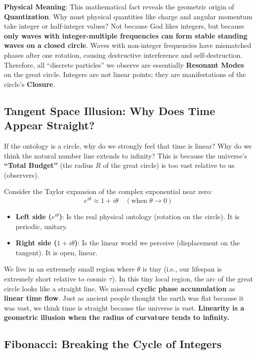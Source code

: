 \textbf{Physical Meaning}:
This mathematical fact reveals the geometric origin of \textbf{Quantization}. Why must physical quantities like charge and angular momentum take integer or half-integer values? Not because God likes integers, but because \textbf{only waves with integer-multiple frequencies can form stable standing waves on a closed circle}.
Waves with non-integer frequencies have mismatched phases after one rotation, causing destructive interference and self-destruction. Therefore, all ``discrete particles'' we observe are essentially \textbf{Resonant Modes} on the great circle. Integers are not linear points; they are manifestations of the circle's \textbf{Closure}.

\subsection{Tangent Space Illusion: Why Does Time Appear Straight?}

If the ontology is a circle, why do we strongly feel that time is linear? Why do we think the natural number line extends to infinity?
This is because the universe's \textbf{``Total Budget''} (the radius $R$ of the great circle) is too vast relative to us (observers).

Consider the Taylor expansion of the complex exponential near zero:
\[e^{i \theta} \approx 1 + i\theta \quad (\text{when } \theta \to 0)\]

\begin{itemize}
\item \textbf{Left side ($e^{i\theta}$)}: Is the real physical ontology (rotation on the circle). It is periodic, unitary.
\item \textbf{Right side ($1+i\theta$)}: Is the linear world we perceive (displacement on the tangent). It is open, linear.
\end{itemize}

We live in an extremely small region where $\theta$ is tiny (i.e., our lifespan is extremely short relative to cosmic $\tau$). In this tiny local region, the arc of the great circle looks like a straight line. We misread \textbf{cyclic phase accumulation} as \textbf{linear time flow}.
Just as ancient people thought the earth was flat because it was vast, we think time is straight because the universe is vast. \textbf{Linearity is a geometric illusion when the radius of curvature tends to infinity.}

\subsection{Fibonacci: Breaking the Cycle of Integers}

